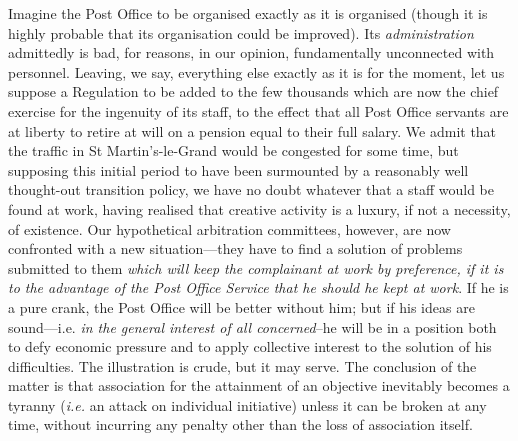 \documentclass{book}
\begin{document}
Imagine the Post Office to be organised exactly as it is organised (though it is highly probable that its organisation could be improved). Its \emph{administration} admittedly is bad, for reasons, in our opinion, fundamentally unconnected with personnel. Leaving, we say, everything else exactly as it is for the moment, let us suppose a Regulation to be added to the few thousands which are now the chief exercise for the ingenuity of its staff, to the effect that all Post Office servants are at liberty to retire at will on a pension equal to their full salary. We admit that the traffic in St Martin’s-le-Grand would be congested for some time, but supposing this initial period to have been surmounted by a reasonably well thought-out transition policy, we have no doubt whatever that a staff would be found at work, having realised that creative activity is a luxury, if not a necessity, of existence. Our hypothetical arbitration committees, however, are now confronted with a new situation—they have to find a solution of problems submitted to them \emph{which will keep the complainant at work by preference, if it is to the advantage of the Post Office Service that he should he kept at work}. If he is a pure crank, the Post Office will be better without him; but if his ideas are sound—i.e. \emph{in the general interest of all concerned}–he will be in a position both to defy economic pressure and to apply collective interest to the solution of his difficulties. The illustration is crude, but it may serve. The conclusion of the matter is that association for the attainment of an objective inevitably becomes a tyranny (\emph{i.e.} an attack on individual initiative) unless it can be broken at any time, without incurring any penalty other than the loss of association itself.
\end{document}
